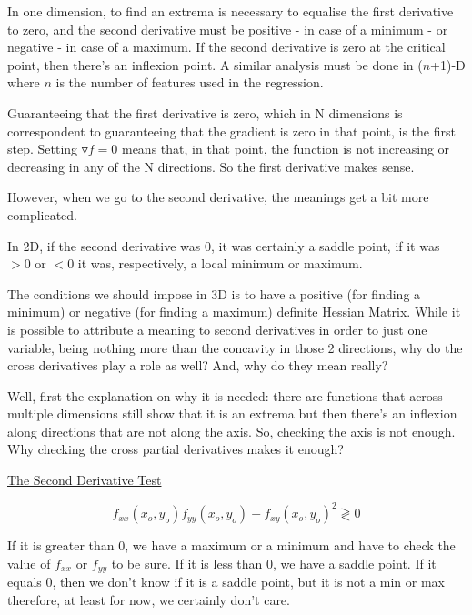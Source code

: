 
In one dimension, to find an extrema is necessary to equalise the first derivative to zero, and the second derivative must be positive - in case of a minimum - or negative - in case of a maximum. If the second derivative is zero at the critical point, then there's an inflexion point. A similar analysis must be done in ($n$+1)-D where $n$ is the number of features used in the regression.

Guaranteeing that the first derivative is zero, which in N dimensions is correspondent to guaranteeing that the gradient is zero in that point, is the first step. Setting $\triangledown f = 0$ means that, in that point, the function is not increasing or decreasing in any of the N directions. So the first derivative makes sense.

However, when we go to the second derivative, the meanings get a bit more complicated.

In 2D, if the second derivative was 0, it was certainly a saddle point, if it was $> 0$ or $< 0$ it was, respectively, a local minimum or maximum.

The conditions we should impose in 3D is to have a positive (for finding a minimum) or negative (for finding a maximum) definite Hessian Matrix. While it is possible to attribute a meaning to second derivatives in order to just one variable, being nothing more than the concavity in those 2 directions, why do the cross derivatives play a role as well? And, why do they mean really?

Well, first the explanation on why it is needed: there are functions that across multiple dimensions still show that it is an extrema but then there's an inflexion along directions that are not along the axis. So, checking the axis is not enough. Why checking the cross partial derivatives makes it enough?

\ul{The Second Derivative Test}

\begin{equation}
    f_{xx}(x_o, y_o) f_{yy}(x_o, y_o) - f_{xy}(x_o, y_o)^2 \gtrless 0
\end{equation}

If it is greater than 0, we have a maximum or a minimum and have to check the value of $f_{xx}$ or $f_{yy}$ to be sure. If it is less than 0, we have a saddle point. If it equals 0, then we don't know if it is a saddle point, but it is not a min or max therefore, at least for now, we certainly don't care.

